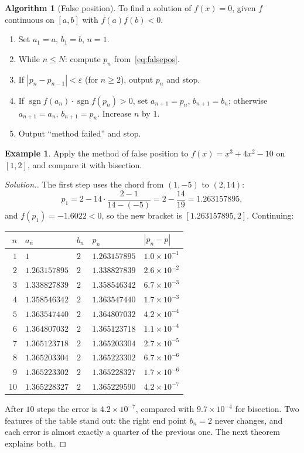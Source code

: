 \documentclass[11pt,a4paper]{article}
\numberwithin{equation}{section}
\DeclareMathOperator{\sgn}{sgn}
\theoremstyle{definition}
\newtheorem{exa}[thm]{Example}
\newtheorem{alg}[thm]{Algorithm}
\newenvironment{solution}
  {\renewcommand{\qedsymbol}{}\begin{proof}[\textit{Solution}.]}
  {\end{proof}}
\begin{document}
\begin{alg}[False position]
\label{alg:falsepos}
To find a solution of $f(x) = 0$, given $f$ continuous on $[a,b]$ with $f(a)f(b)<0$.
\begin{enumerate}[label=Step \arabic*:,leftmargin=*]
\item Set $a_1 = a$, $b_1 = b$, $n = 1$.
\item While $n\leq N$: compute $p_n$ from~\eqref{eq:falsepos}.
\item If $|p_n-p_{n-1}|<\varepsilon$ (for $n\geq2$), output $p_n$ and stop.
\item If $\sgn f(a_n)\cdot\sgn f(p_n)>0$, set $a_{n+1} = p_n$, $b_{n+1} = b_n$; otherwise $a_{n+1} = a_n$, $b_{n+1} = p_n$. Increase $n$ by $1$.
\item Output ``method failed'' and stop.
\end{enumerate}
\end{alg}

\begin{exa}
\label{exa:falsepos}
Apply the method of false position to $f(x) = x^3+4x^2-10$ on $[1,2]$, and compare it with bisection.
\end{exa}

\begin{solution}
The first step uses the chord from $(1,-5)$ to $(2,14)$:
$$p_1 = 2-14\cdot\frac{2-1}{14-(-5)} = 2-\frac{14}{19} = 1.263157895,$$
and $f(p_1) = -1.6022<0$, so the new bracket is $[1.263157895, 2]$. Continuing:
\begin{center}
\begin{tabular}{rllll}
\hline
$n$ & $a_n$ & $b_n$ & $p_n$ & $|p_n-p|$\\
\hline
$1$ & $1$ & $2$ & $1.263157895$ & $1.0\times10^{-1}$\\
$2$ & $1.263157895$ & $2$ & $1.338827839$ & $2.6\times10^{-2}$\\
$3$ & $1.338827839$ & $2$ & $1.358546342$ & $6.7\times10^{-3}$\\
$4$ & $1.358546342$ & $2$ & $1.363547440$ & $1.7\times10^{-3}$\\
$5$ & $1.363547440$ & $2$ & $1.364807032$ & $4.2\times10^{-4}$\\
$6$ & $1.364807032$ & $2$ & $1.365123718$ & $1.1\times10^{-4}$\\
$7$ & $1.365123718$ & $2$ & $1.365203304$ & $2.7\times10^{-5}$\\
$8$ & $1.365203304$ & $2$ & $1.365223302$ & $6.7\times10^{-6}$\\
$9$ & $1.365223302$ & $2$ & $1.365228327$ & $1.7\times10^{-6}$\\
$10$ & $1.365228327$ & $2$ & $1.365229590$ & $4.2\times10^{-7}$\\
\hline
\end{tabular}
\end{center}
After $10$ steps the error is $4.2\times10^{-7}$, compared with $9.7\times10^{-4}$ for bisection. Two features of the table stand out:
the right end point $b_n = 2$ never changes, and each error is almost exactly a quarter of the previous one. The next theorem explains
both.
\end{solution}
\end{document}
